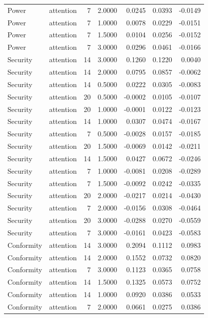 \begin{tabular}{llrrrrr}
Power & attention & 7 & 2.0000 & 0.0245 & 0.0393 & -0.0149 \\
Power & attention & 7 & 1.0000 & 0.0078 & 0.0229 & -0.0151 \\
Power & attention & 7 & 1.5000 & 0.0104 & 0.0256 & -0.0152 \\
Power & attention & 7 & 3.0000 & 0.0296 & 0.0461 & -0.0166 \\
Security & attention & 14 & 3.0000 & 0.1260 & 0.1220 & 0.0040 \\
Security & attention & 14 & 2.0000 & 0.0795 & 0.0857 & -0.0062 \\
Security & attention & 14 & 0.5000 & 0.0222 & 0.0305 & -0.0083 \\
Security & attention & 20 & 0.5000 & -0.0002 & 0.0105 & -0.0107 \\
Security & attention & 20 & 1.0000 & -0.0001 & 0.0122 & -0.0123 \\
Security & attention & 14 & 1.0000 & 0.0307 & 0.0474 & -0.0167 \\
Security & attention & 7 & 0.5000 & -0.0028 & 0.0157 & -0.0185 \\
Security & attention & 20 & 1.5000 & -0.0069 & 0.0142 & -0.0211 \\
Security & attention & 14 & 1.5000 & 0.0427 & 0.0672 & -0.0246 \\
Security & attention & 7 & 1.0000 & -0.0081 & 0.0208 & -0.0289 \\
Security & attention & 7 & 1.5000 & -0.0092 & 0.0242 & -0.0335 \\
Security & attention & 20 & 2.0000 & -0.0217 & 0.0214 & -0.0430 \\
Security & attention & 7 & 2.0000 & -0.0156 & 0.0308 & -0.0464 \\
Security & attention & 20 & 3.0000 & -0.0288 & 0.0270 & -0.0559 \\
Security & attention & 7 & 3.0000 & -0.0161 & 0.0423 & -0.0583 \\
Conformity & attention & 14 & 3.0000 & 0.2094 & 0.1112 & 0.0983 \\
Conformity & attention & 14 & 2.0000 & 0.1552 & 0.0732 & 0.0820 \\
Conformity & attention & 7 & 3.0000 & 0.1123 & 0.0365 & 0.0758 \\
Conformity & attention & 14 & 1.5000 & 0.1325 & 0.0573 & 0.0752 \\
Conformity & attention & 14 & 1.0000 & 0.0920 & 0.0386 & 0.0533 \\
Conformity & attention & 7 & 2.0000 & 0.0661 & 0.0275 & 0.0386 \\

\end{tabular}
